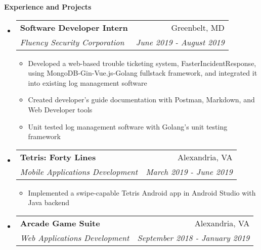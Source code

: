 \documentclass[letterpaper,11pt]{article}
\makeatletter
\newcommand{\resitem}[1]{\item #1 \vspace{-2pt}}
\newcommand{\resheading}[1]{{\large \colorbox{mygrey}{\begin{minipage}{\textwidth}{\textbf{#1 \vphantom{p\^{E}}}}\end{minipage}}}}
\newcommand{\ressubheading}[4]{
\begin{tabular*}{7.0in}{l@{\extracolsep{\fill}}r}
		\textbf{#1} & #2 \\
		\textit{#3} & \textit{#4} \\
\end{tabular*}\vspace{-6pt}}
\makeatother
\begin{document}
\resheading{Experience and Projects}

\begin{itemize}
\item
    \ressubheading{Software Developer Intern}{Greenbelt, MD}{Fluency Security Corporation}{June 2019 - August 2019}
	\begin{itemize}
	    \resitem{Developed a web-based trouble ticketing system, FasterIncidentResponse, using MongoDB-Gin-Vue.js-Golang fullstack framework, and integrated it into existing log management software}
		\resitem{Created developer's guide documentation with Postman, Markdown, and Web Developer tools}
		\resitem{Unit tested log management software with Golang's unit testing framework}
	\end{itemize}
\item
    \ressubheading{Tetris: Forty Lines}{Alexandria, VA}{Mobile Applications Development}{March 2019 - June 2019}
	\begin{itemize}
		\resitem{Implemented a swipe-capable Tetris Android app in Android Studio with Java backend}
	\end{itemize}
\item
    \ressubheading{Arcade Game Suite}{Alexandria, VA}{Web Applications Development}{September 2018 - January 2019}

\end{itemize}
\end{document}
